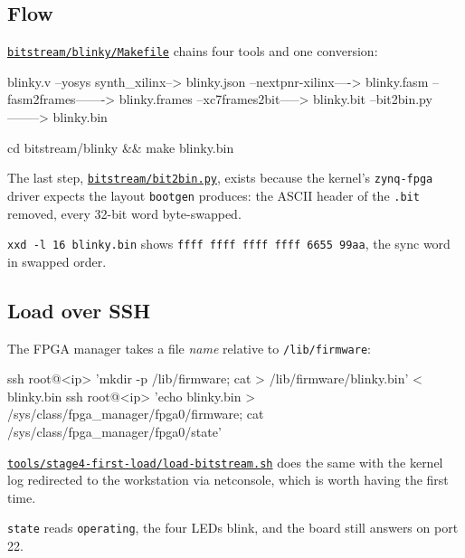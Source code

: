 \documentclass[11pt,a4paper,oneside]{article}
\newcommand{\file}[1]{{\color{bluemid}\nolinkurl{#1}}}
\newcommand{\cmd}[1]{\texttt{#1}}
\newcommand{\repo}{https://github.com/MaxClerkwell/ax7020-bringup}
\newcommand{\rfile}[1]{\href{\repo/blob/master/#1}{\color{bluemid}\nolinkurl{#1}}}
\begin{document}
\subsection{Flow}

\rfile{bitstream/blinky/Makefile} chains four tools and one conversion:

\begin{code}
blinky.v  --yosys synth_xilinx-->  blinky.json
          --nextpnr-xilinx---->  blinky.fasm
          --fasm2frames------->  blinky.frames
          --xc7frames2bit----->  blinky.bit
          --bit2bin.py-------->  blinky.bin
\end{code}

\begin{shell}
cd bitstream/blinky && make blinky.bin
\end{shell}

The last step, \rfile{bitstream/bit2bin.py}, exists because the kernel's
\cmd{zynq-fpga} driver expects the layout \cmd{bootgen} produces: the ASCII
header of the \cmd{.bit} removed, every 32-bit word byte-swapped.

\begin{checkpoint}
\cmd{xxd -l 16 blinky.bin} shows \cmd{ffff ffff ffff ffff 6655 99aa}, the sync
word in swapped order.
\end{checkpoint}

\subsection{Load over SSH}

The FPGA manager takes a file \emph{name} relative to \file{/lib/firmware}:

\begin{shell}
ssh root@<ip> 'mkdir -p /lib/firmware; cat > /lib/firmware/blinky.bin' < blinky.bin
ssh root@<ip> 'echo blinky.bin > /sys/class/fpga_manager/fpga0/firmware;
               cat /sys/class/fpga_manager/fpga0/state'
\end{shell}

\rfile{tools/stage4-first-load/load-bitstream.sh} does the same with the
kernel log redirected to the workstation via netconsole, which is worth
having the first time.

\begin{checkpoint}
\cmd{state} reads \cmd{operating}, the four LEDs blink, and the board still
answers on port 22.
\end{checkpoint}

\end{document}
